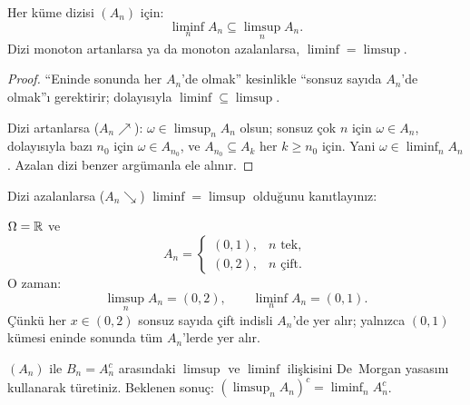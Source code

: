 \begin{teorem}[$\liminf \subseteq \limsup$]\label{thm:liminf_subseteq}
Her küme dizisi $(A_n)$ için:
\[
  \liminf_{n} A_n \subseteq \limsup_{n} A_n.
\]
Dizi monoton artanlarsa ya da monoton azalanlarsa, $\liminf = \limsup$.
\end{teorem}

\begin{proof}
``Eninde sonunda her $A_n$'de olmak'' kesinlikle ``sonsuz sayıda $A_n$'de olmak''ı
gerektirir; dolayısıyla $\liminf \subseteq \limsup$.

Dizi artanlarsa ($A_n \nearrow$): $\omega \in \limsup_n A_n$ olsun; sonsuz çok $n$
için $\omega \in A_n$, dolayısıyla bazı $n_0$ için $\omega \in A_{n_0}$, ve
$A_{n_0} \subseteq A_k$ her $k \geq n_0$ için. Yani $\omega \in \liminf_n A_n$.
Azalan dizi benzer argümanla ele alınır.
\end{proof}

\begin{ispatiskele}
Dizi azalanlarsa ($A_n \searrow$) $\liminf = \limsup$ olduğunu kanıtlayınız:



\end{ispatiskele}

\begin{ornek}\label{ex:limsupkume}
$\Omega = \mathbb{R}$ ve
\[
  A_n =
  \begin{cases}
    (0,1), & n \text{ tek}, \\
    (0,2), & n \text{ çift}.
  \end{cases}
\]
O zaman:
\[
  \limsup_n A_n = (0,2),
  \qquad
  \liminf_n A_n = (0,1).
\]
Çünkü her $x \in (0,2)$ sonsuz sayıda çift indisli $A_n$'de yer alır;
yalnızca $(0,1)$ kümesi eninde sonunda tüm $A_n$'lerde yer alır.
\end{ornek}

\begin{kendinleifade}
$(A_n)$ ile $B_n = A_n^c$ arasındaki $\limsup$ ve $\liminf$ ilişkisini
De~Morgan yasasını kullanarak türetiniz. Beklenen sonuç:
$\left(\limsup_n A_n\right)^c = \liminf_n A_n^c$.
\end{kendinleifade}

